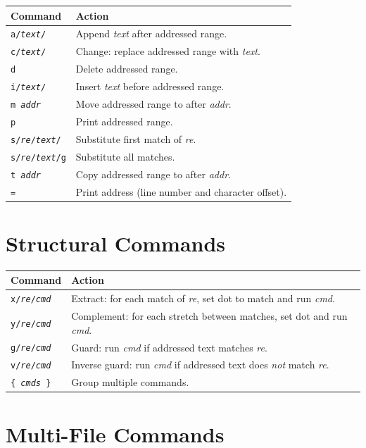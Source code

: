 \begin{longtable}{@{}lp{3.5in}@{}}
\toprule
Command & Action \\
\midrule
\endhead
\texttt{a/\textit{text}/} & Append \textit{text} after addressed range. \\
\texttt{c/\textit{text}/} & Change: replace addressed range with \textit{text}. \\
\texttt{d} & Delete addressed range. \\
\texttt{i/\textit{text}/} & Insert \textit{text} before addressed range. \\
\texttt{m \textit{addr}} & Move addressed range to after \textit{addr}. \\
\texttt{p} & Print addressed range. \\
\texttt{s/\textit{re}/\textit{text}/} & Substitute first match of \textit{re}. \\
\texttt{s/\textit{re}/\textit{text}/g} & Substitute all matches. \\
\texttt{t \textit{addr}} & Copy addressed range to after \textit{addr}. \\
\texttt{=} & Print address (line number and character offset). \\
\bottomrule
\end{longtable}

\section{Structural Commands}

\begin{longtable}{@{}lp{3.5in}@{}}
\toprule
Command & Action \\
\midrule
\endhead
\texttt{x/\textit{re}/\textit{cmd}} & Extract: for each match of \textit{re}, set
  dot to match and run \textit{cmd}. \\
\texttt{y/\textit{re}/\textit{cmd}} & Complement: for each stretch between
  matches, set dot and run \textit{cmd}. \\
\texttt{g/\textit{re}/\textit{cmd}} & Guard: run \textit{cmd} if addressed text
  matches \textit{re}. \\
\texttt{v/\textit{re}/\textit{cmd}} & Inverse guard: run \textit{cmd} if addressed
  text does \emph{not} match \textit{re}. \\
\texttt{\{ \textit{cmds} \}} & Group multiple commands. \\
\bottomrule
\end{longtable}

\section{Multi-File Commands}

